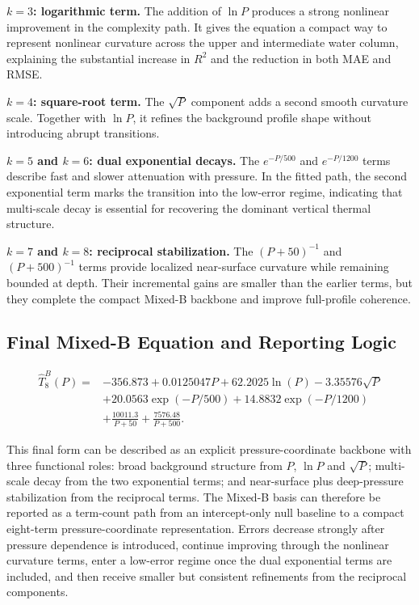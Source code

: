 \documentclass[10pt]{article}
\begin{document}
\vspace{0.25em}
\noindent\textbf{$k=3$: logarithmic term.}
The addition of $\ln P$ produces a strong nonlinear improvement in the complexity path.
It gives the equation a compact way to represent nonlinear curvature across the upper and intermediate water column, explaining the substantial increase in $R^2$ and the reduction in both MAE and RMSE.

\vspace{0.25em}
\noindent\textbf{$k=4$: square-root term.}
The $\sqrt{P}$ component adds a second smooth curvature scale.
Together with $\ln P$, it refines the background profile shape without introducing abrupt transitions.

\vspace{0.25em}
\noindent\textbf{$k=5$ and $k=6$: dual exponential decays.}
The $e^{-P/500}$ and $e^{-P/1200}$ terms describe fast and slower attenuation with pressure.
In the fitted path, the second exponential term marks the transition into the low-error regime, indicating that multi-scale decay is essential for recovering the dominant vertical thermal structure.

\vspace{0.25em}
\noindent\textbf{$k=7$ and $k=8$: reciprocal stabilization.}
The $(P+50)^{-1}$ and $(P+500)^{-1}$ terms provide localized near-surface curvature while remaining bounded at depth.
Their incremental gains are smaller than the earlier terms, but they complete the compact Mixed-B backbone and improve full-profile coherence.

\subsection{Final Mixed-B Equation and Reporting Logic}

\[
\begin{aligned}
\hat{T}_{8}^{B}(P)=&-356.873
+0.0125047P
+62.2025\ln(P)
-3.35576\sqrt{P} \\
&+20.0563\exp(-P/500)
+14.8832\exp(-P/1200) \\
&+\frac{10011.3}{P+50}
+\frac{7576.48}{P+500}.
\end{aligned}
\]

\noindent
This final form can be described as an explicit pressure-coordinate backbone with three functional roles: broad background structure from $P$, $\ln P$ and $\sqrt{P}$; multi-scale decay from the two exponential terms; and near-surface plus deep-pressure stabilization from the reciprocal terms.
The Mixed-B basis can therefore be reported as a term-count path from an intercept-only null baseline to a compact eight-term pressure-coordinate representation.
Errors decrease strongly after pressure dependence is introduced, continue improving through the nonlinear curvature terms, enter a low-error regime once the dual exponential terms are included, and then receive smaller but consistent refinements from the reciprocal components.
\end{document}
